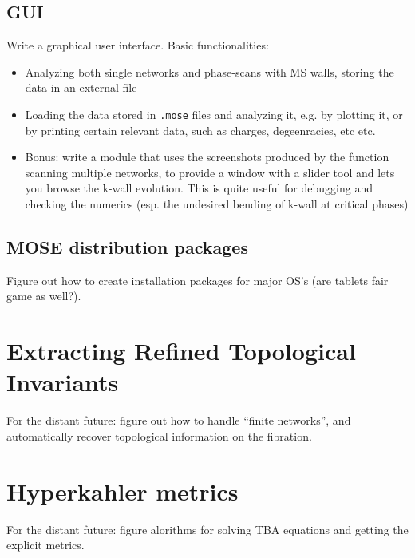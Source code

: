 \documentclass[11pt]{report}
\begin{document}
\section{GUI}
Write a graphical user interface. Basic functionalities:
\begin{itemize}
	\item Analyzing both single networks and phase-scans with MS walls, storing the data in an external file
	\item Loading the data stored in {\tt*.mose} files and analyzing it, e.g. by plotting it, or by printing certain relevant data, such as charges, degeenracies, etc etc.
	\item Bonus: write a module that uses the screenshots produced by the function scanning multiple networks, to provide a window with a slider tool and lets you browse the k-wall evolution. This is quite useful for debugging and checking the numerics (esp. the undesired bending of k-wall at critical phases)
\end{itemize}



\section{MOSE distribution packages}
Figure out how to create installation packages for major OS's (are tablets fair game as well?).


\chapter{Extracting Refined Topological Invariants}

For the distant future: figure out how to handle ``finite networks'', and automatically recover topological information on the fibration.





\chapter{Hyperkahler metrics}

For the distant future: figure alorithms for solving TBA equations and getting the explicit metrics.
\end{document}
